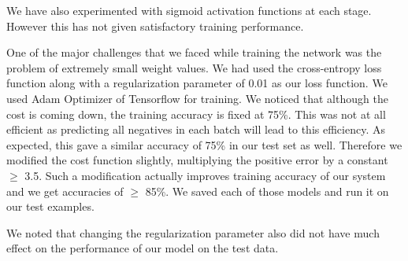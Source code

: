 \documentclass{article}
\begin{document}
\begin{itemize}
\begin{itemize}
\end{itemize}
We have also experimented with sigmoid activation functions at each stage. However this has not given satisfactory training performance.\par
One of the major challenges that we faced while training the network was the problem of extremely small weight values. We had used the cross-entropy loss function along with a regularization parameter of 0.01 as our loss function. We used Adam Optimizer of Tensorflow for training. We noticed that although the cost is coming down, the training accuracy is fixed at 75\%. This was not at all efficient as predicting all negatives in each batch will lead to this efficiency. As expected, this gave a similar accuracy of 75\% in our test set as well. Therefore we modified the cost function slightly, multiplying the positive error by a constant $\geqslant$ 3.5. Such a modification actually improves training accuracy of our system and we get accuracies of $\geqslant$ 85\%. We saved each of those models and run it on our test examples.\par
We noted that changing the regularization parameter also did not have much effect on the performance of our model on the test data.
\end{itemize}
\end{document}
